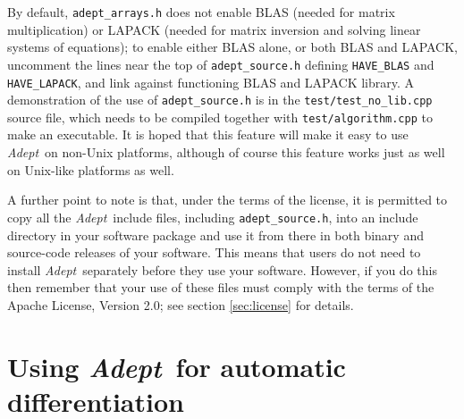 \documentclass[a4,oneside]{book}
\def\codesize{\small}
\def\Adept{\emph{Adept}}
\def\code#1{{\codesize\texttt{#1}}}
\begin{document}
By default, \code{adept\_arrays.h} does not enable BLAS (needed for
matrix multiplication) or LAPACK (needed for matrix inversion and
solving linear systems of equations); to enable either BLAS alone, or
both BLAS and LAPACK, uncomment the lines near the top of
\code{adept\_source.h} defining \code{HAVE\_BLAS} and
\code{HAVE\_LAPACK}, and link against functioning BLAS and LAPACK
library. A demonstration of the use of \code{adept\_source.h} is in
the \code{test/test\_no\_lib.cpp} source file, which needs to be
compiled together with \code{test/algorithm.cpp} to make an
executable.
%
It is hoped that this feature will make it easy to use \Adept\ on
non-Unix platforms, although of course this feature works just as well
on Unix-like platforms as well.

A further point to note is that, under the terms of the license, it is
permitted to copy all the \Adept\ include files, including
\code{adept\_source.h}, into an include directory in your software
package and use it from there in both binary and source-code releases
of your software. This means that users do not need to install
\Adept\ separately before they use your software.  However, if you do
this then remember that your use of these files must comply with the
terms of the Apache License, Version 2.0; see section
\ref{sec:license} for details.
%
\chapter{Using \Adept\ for automatic differentiation}
\label{chap:ad}
%
\end{document}
